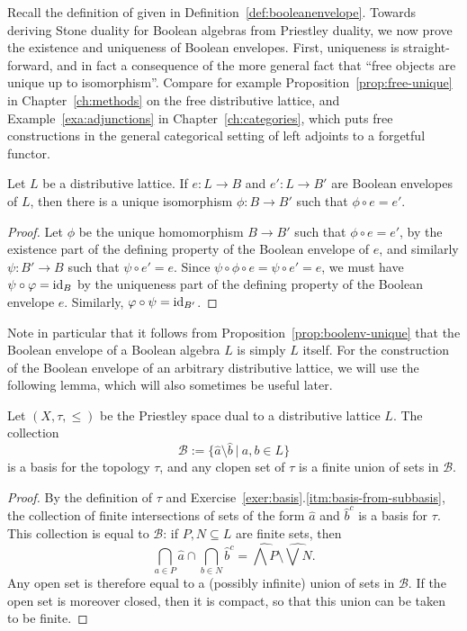 Recall the definition of  given in Definition~\ref{def:booleanenvelope}. Towards deriving Stone duality for Boolean algebras from Priestley duality, we now prove the existence and uniqueness of Boolean envelopes. First, uniqueness is straight-forward, and in fact a consequence of the more general fact that ``free objects are unique up to isomorphism''. Compare for example Proposition~\ref{prop:free-unique} in Chapter~\ref{ch:methods} on the free distributive lattice, and Example~\ref{exa:adjunctions} in Chapter~\ref{ch:categories}, which puts free constructions in the general categorical setting of left adjoints to a forgetful functor.
\begin{proposition}\label{prop:boolenv-unique}
Let $L$ be a distributive lattice. If $e \colon L \to B$ and $e' \colon L \to B'$ are Boolean envelopes of $L$, then there is a unique isomorphism $\phi \colon B \to B'$ such that $\phi \circ e = e'$.
\end{proposition}
\begin{proof}
Let $\phi$ be the unique homomorphism $B \to B'$ such that $\phi \circ e = e'$, by the existence part of the defining property of the Boolean envelope of $e$, and similarly $\psi \colon B' \to B$ such that $\psi \circ e' = e$. Since $\psi \circ \phi \circ e = \psi \circ e' = e$, we must have $\psi \circ \varphi = \mathrm{id}_B$ by the uniqueness part of the defining property of the Boolean envelope $e$.  Similarly, $\varphi \circ \psi = \mathrm{id}_{B'}$.
\end{proof}
Note in particular that it follows from Proposition~\ref{prop:boolenv-unique} that the Boolean envelope of a Boolean algebra $L$ is simply $L$ itself. 
For the construction of the Boolean envelope of an arbitrary distributive lattice, we will use the following lemma, which will also sometimes be useful later.
\begin{lemma}\label{lem:Priestleybasis}
Let $(X, \tau, \leq)$ be the Priestley space dual to a distributive lattice $L$. The collection
\[ \mathcal{B} := \{ \widehat{a} \setminus \widehat{b} \ | \ a, b \in L\}\]
is a basis for the topology $\tau$, and any clopen set of $\tau$ is a finite union of sets in $\mathcal{B}$.
\end{lemma}
\begin{proof}
By the definition of $\tau$ and Exercise~\ref{exer:basis}.\ref{itm:basis-from-subbasis}, the collection of finite intersections of sets of the form $\widehat{a}$ and $\widehat{b}^c$ is a basis for $\tau$. This collection is equal to $\mathcal{B}$: if $P, N \subseteq L$ are finite sets, then 
\[ \bigcap_{a \in P} \widehat{a} \cap \bigcap_{b \in N} \widehat{b}^c = \widehat{\bigwedge P} \setminus \widehat{\bigvee N}.\]
Any open set is therefore equal to a (possibly infinite) union of sets in $\mathcal{B}$. If the open set is moreover closed, then it is compact, so that this union can be taken to be finite.
\end{proof}
